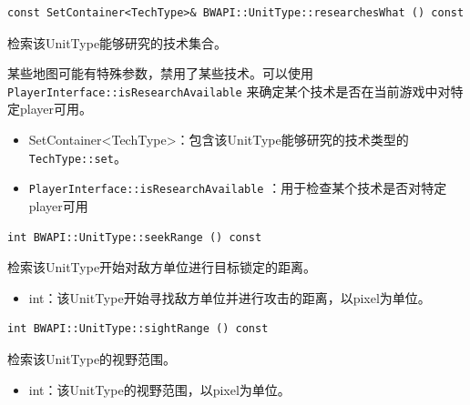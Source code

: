 \begin{tcolorbox}[colback=white, colframe=black!60!white, title=researchesWhat(), arc=0mm]
    \begin{verbatim}
const SetContainer<TechType>& BWAPI::UnitType::researchesWhat () const
    \end{verbatim}
    检索该UnitType能够研究的技术集合。
    \begin{note}
        某些地图可能有特殊参数，禁用了某些技术。可以使用   \verb|PlayerInterface::isResearchAvailable|   来确定某个技术是否在当前游戏中对特定player可用。
    \end{note}
    \begin{return}
        \begin{itemize}
            \item SetContainer<TechType>：包含该UnitType能够研究的技术类型的  \verb|TechType::set|。
        \end{itemize}
    \end{return}
    \begin{refer}
        \begin{itemize}
            \item \verb|PlayerInterface::isResearchAvailable|  ：用于检查某个技术是否对特定player可用
        \end{itemize}
    \end{refer}
\end{tcolorbox}


\begin{tcolorbox}[colback=white, colframe=black!60!white, title=seekRange(), arc=0mm]
    \begin{verbatim}
int BWAPI::UnitType::seekRange () const
    \end{verbatim}
    检索该UnitType开始对敌方单位进行目标锁定的距离。
    \begin{return}
        \begin{itemize}
            \item int：该UnitType开始寻找敌方单位并进行攻击的距离，以pixel为单位。
        \end{itemize}
    \end{return}
\end{tcolorbox}


\begin{tcolorbox}[colback=white, colframe=black!60!white, title=sightRange(), arc=0mm]
    \begin{verbatim}
int BWAPI::UnitType::sightRange () const
    \end{verbatim}
    检索该UnitType的视野范围。
    \begin{return}
        \begin{itemize}
            \item int：该UnitType的视野范围，以pixel为单位。
        \end{itemize}
    \end{return}
\end{tcolorbox}


